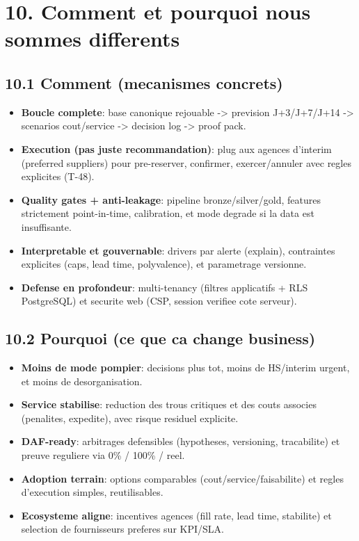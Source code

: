 \documentclass[11pt,a4paper]{article}
\begin{document}
\section*{10. Comment et pourquoi nous sommes differents}
\subsection*{10.1 Comment (mecanismes concrets)}
\begin{itemize}
  \item \textbf{Boucle complete}: base canonique rejouable -> prevision J+3/J+7/J+14 -> scenarios cout/service -> decision log -> proof pack.
  \item \textbf{Execution (pas juste recommandation)}: plug aux agences d'interim (preferred suppliers) pour pre-reserver, confirmer, exercer/annuler avec regles explicites (T-48).
  \item \textbf{Quality gates + anti-leakage}: pipeline bronze/silver/gold, features strictement point-in-time, calibration, et mode degrade si la data est insuffisante.
  \item \textbf{Interpretable et gouvernable}: drivers par alerte (explain), contraintes explicites (caps, lead time, polyvalence), et parametrage versionne.
  \item \textbf{Defense en profondeur}: multi-tenancy (filtres applicatifs + RLS PostgreSQL) et securite web (CSP, session verifiee cote serveur).
\end{itemize}

\subsection*{10.2 Pourquoi (ce que ca change business)}
\begin{itemize}
  \item \textbf{Moins de mode pompier}: decisions plus tot, moins de HS/interim urgent, et moins de desorganisation.
  \item \textbf{Service stabilise}: reduction des trous critiques et des couts associes (penalites, expedite), avec risque residuel explicite.
  \item \textbf{DAF-ready}: arbitrages defensibles (hypotheses, versioning, tracabilite) et preuve reguliere via 0\% / 100\% / reel.
  \item \textbf{Adoption terrain}: options comparables (cout/service/faisabilite) et regles d'execution simples, reutilisables.
  \item \textbf{Ecosysteme aligne}: incentives agences (fill rate, lead time, stabilite) et selection de fournisseurs preferes sur KPI/SLA.
\end{itemize}
\end{document}
